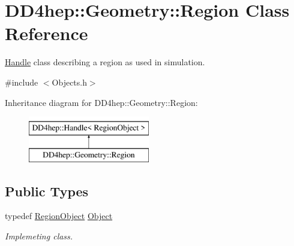 \hypertarget{class_d_d4hep_1_1_geometry_1_1_region}{}\section{D\+D4hep\+:\+:Geometry\+:\+:Region Class Reference}
\label{class_d_d4hep_1_1_geometry_1_1_region}


\hyperlink{class_d_d4hep_1_1_handle}{Handle} class describing a region as used in simulation.  




{\ttfamily \#include $<$Objects.\+h$>$}

Inheritance diagram for D\+D4hep\+:\+:Geometry\+:\+:Region\+:\begin{figure}[H]
\begin{center}
\leavevmode
\includegraphics[height=2.000000cm]{class_d_d4hep_1_1_geometry_1_1_region}
\end{center}
\end{figure}
\subsection*{Public Types}
\begin{DoxyCompactItemize}
\item 
typedef \hyperlink{class_d_d4hep_1_1_geometry_1_1_region_object}{Region\+Object} \hyperlink{class_d_d4hep_1_1_geometry_1_1_region_ab66f17984d7dad2a865c8950b3604503}{Object}
\begin{DoxyCompactList}\small\item\em Implemeting class. \end{DoxyCompactList}\end{DoxyCompactItemize}
